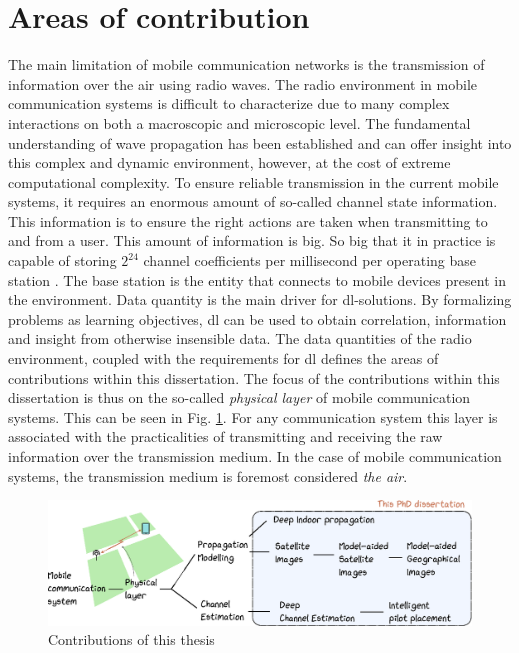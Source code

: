 \section*{Areas of contribution}
The main limitation of mobile communication networks is the transmission of information over the air using radio waves. The radio environment in mobile communication systems is difficult to characterize due to many complex interactions on both a macroscopic and microscopic level. The fundamental understanding of wave propagation has been established and can offer insight into this complex and dynamic environment, however, at the cost of extreme computational complexity. To ensure reliable transmission in the current mobile systems,  it requires an enormous amount of so-called channel state information. This information is to ensure the right actions are taken when transmitting to and from a user. This amount of information is big. So big that it in practice is capable of storing $2^{24}$ channel coefficients per millisecond per operating base station \cite{Studer2018}. The base station is the entity that connects to mobile devices present in the environment. Data quantity is the main driver for \gls{dl}-solutions.  By formalizing problems as learning objectives, \gls{dl} can be used to obtain correlation, information and insight from otherwise insensible data. The data quantities of the radio environment, coupled with the requirements for \gls{dl} defines the areas of contributions within this dissertation. The focus of the contributions within this dissertation is thus on the so-called \emph{physical layer} of mobile communication systems. This can be seen in Fig. \ref{fig:areas_of_contribution}. For any communication system this layer is associated with the practicalities of transmitting and receiving the raw information over the transmission medium. In the case of mobile communication systems, the transmission medium is foremost considered \emph{the air}. 



\begin{figure}
\includegraphics[width=\textwidth]{chapters/figures/intro_figure.eps}
\caption{Contributions of this thesis}\label{fig:areas_of_contribution}
\end{figure}

